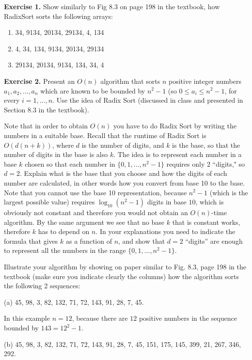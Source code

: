 \documentclass[11pt]{article}
\begin{document}

\textbf{Exercise 1.} Show similarly to Fig 8.3 on page 198 in the textbook, how \textsf{RadixSort} sorts the following arrays:
\begin{enumerate}
\item 34, 9134, 20134, 29134, 4, 134
\item 4, 34, 134, 9134, 20134, 29134
\item 29134, 20134, 9134, 134, 34, 4
\end{enumerate}

\textbf{Exercise 2.} Present an $O(n)$ algorithm that sorts $n$ positive integer numbers  $a_1, a_2, \ldots, a_n$ which are known to be bounded by $n^2-1$ (so $0 \leq a_i \leq n^2-1$, for every $i=1, \ldots, n$. Use the idea of Radix Sort  (discussed in class and presented in Section 8.3 in the textbook).

Note that in order to obtain $O(n)$ you have to do Radix Sort by writing the numbers in a suitable base.  Recall that the runtime of Radix Sort is $O(d (n+k))$, where $d$ is the number of digits, and $k$ is the base, so that the number of digits in the base is also $k$. The idea is to represent each number in a base $k$ chosen so that  each number in $\{0,1, \ldots, n^2-1\}$  requires only $2$ ``digits," so $d=2$.   Explain what is the base that you choose and  how the digits of each number are calculated, in other words how you convert from base 10 to the base.  Note that you cannot use the base 10 representation, because $n^2-1$ (which is the largest possible value) requires $\log_{10} (n^2-1)$ digits in base $10$, which is obviously not constant and therefore you would not obtain an $O(n)$-time algorithm.   By the same argument we see that no base $k$ that is constant works, therefore $k$ has to depend on $n$.   In your explanations you need to indicate the formula that gives $k$ as a function of $n$, and show that $d=2$ ``digits'' are enough to represent all the numbers in the range $\{0,1, \ldots, n^2-1\}$.

Illustrate your algorithm by showing on paper similar to Fig. 8.3, page 198 in the textbook (make sure you indicate clearly the columns)  how the algorithm sorts the following 2 sequences: 
\smallskip

(a) 45, 98, 3, 82, 132, 71, 72, 143, 91, 28, 7, 45.

In this example $n=12$, because there are $12$ positive numbers in the sequence bounded by $143 = 12^2 - 1$. 
\smallskip

(b) 45, 98, 3, 82, 132, 71, 72, 143, 91, 28, 7, 45, 151, 175, 145, 399, 21, 267, 346, 292.
\end{document}

